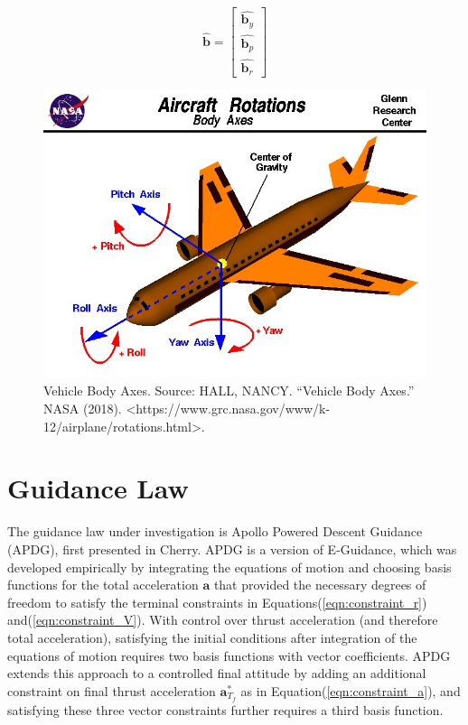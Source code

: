 \begin{equation}
\label{eqn:bodyframe}
\hat{\bm{b}} = 
\begin{bmatrix}
\hat{\bm{b}_y} \\
\hat{\bm{b}_p} \\
\hat{\bm{b}_r}
\end{bmatrix}
\end{equation}

\begin{figure}[H]
	\centering
	\begin{minipage}{4.3 in}
		\includegraphics[width=\linewidth]{Figures/bodyaxes.jpg}
		\caption{Vehicle Body Axes. Source: HALL, NANCY. “Vehicle Body Axes.” NASA (2018).
			<https://www.grc.nasa.gov/www/k-12/airplane/rotations.html>. \label{fig:bodyaxes} }
	\end{minipage}
\end{figure}

\section{Guidance Law} \label{sec:guidancelaw}
The guidance law under investigation is Apollo Powered Descent Guidance (APDG), first presented in Cherry\:\cite{CHERRY}. APDG is a version of E-Guidance, which was developed empirically by integrating the equations of motion and choosing basis functions for the total acceleration $\bm{a}$ that provided the necessary degrees of freedom to satisfy the terminal constraints in Equations\:(\ref{eqn:constraint_r}) and\:(\ref{eqn:constraint_V}). With control over thrust acceleration (and therefore total acceleration), satisfying the initial conditions after integration of the equations of motion requires two basis functions with vector coefficients. APDG extends this approach to a controlled final attitude by adding an additional constraint on final thrust acceleration $\bm{a}^*_{T_f}$ as in Equation\:(\ref{eqn:constraint_a}), and satisfying these three vector constraints further requires a third basis function. 


